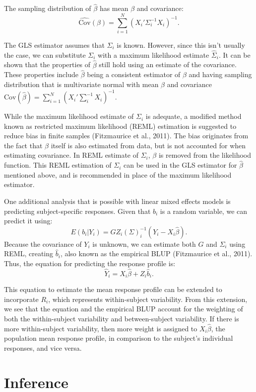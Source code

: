 \documentclass[12pt, twoside]{amherstthesis}
\begin{document}
The sampling distribution of \(\hat\beta\) has mean \(\beta\) and covariance:
\[\widehat{\text{Cov}}(\beta) = \sum_{i=1}^N(X_i'\Sigma^{-1}_iX_i)^{-1}.\]

The GLS estimator assumes that \(\Sigma_i\) is known. However, since this isn't usually the case, we can substitute \(\Sigma_i\) with a maximum likelihood estimate \(\hat\Sigma_i.\) It can be shown that the properties of \(\hat\beta\) still hold using an estimate of the covariance. These properties include \(\hat\beta\) being a consistent estimator of \(\beta\) and having sampling distribution that is multivariate normal with mean \(\beta\) and covariance \(\text{Cov}(\hat\beta) = \sum_{i=1}^{N}(X_i'\sum_i^{-1}X_i)^{-1}.\)

While the maximum likelihood estimate of \(\Sigma_i\) is adequate, a modified method known as restricted maximum likelihood (REML) estimation is suggested to reduce bias in finite samples (Fitzmaurice et al., 2011). The bias originates from the fact that \(\beta\) itself is also estimated from data, but is not accounted for when estimating covariance. In REML estimate of \(\Sigma_i\), \(\beta\) is removed from the likelihood function. This REML estimation of \(\Sigma_i\) can be used in the GLS estimator for \(\hat\beta\) mentioned above, and is recommended in place of the maximum likelihood estimator.

One additional analysis that is possible with linear mixed effects models is predicting subject-specific responses. Given that \(b_i\) is a random variable, we can predict it using:
\[E(b_i |Y_i) = GZ_i (\Sigma)^{-1}_i(Y_i-X_i\hat\beta).\] Because the covariance of \(Y_i\) is unknown, we can estimate both \(G\) and \(\Sigma_i\) using REML, creating \(\hat b_i\), also known as the empirical BLUP (Fitzmaurice et al., 2011). Thus, the equation for predicting the response profile is:
\[\hat Y_i = X_i\hat\beta +Z_i\hat b_i.\]

This equation to estimate the mean response profile can be extended to incorporate \(R_i\), which represents within-subject variability. From this extension, we see that the equation and the empirical BLUP account for the weighting of both the within-subject variability and between-subject variability. If there is more within-subject variability, then more weight is assigned to \(X_i\hat\beta\), the population mean response profile, in comparison to the subject's individual responses, and vice versa.

\hypertarget{inference}{%
\section{Inference}\label{inference}}
\end{document}
